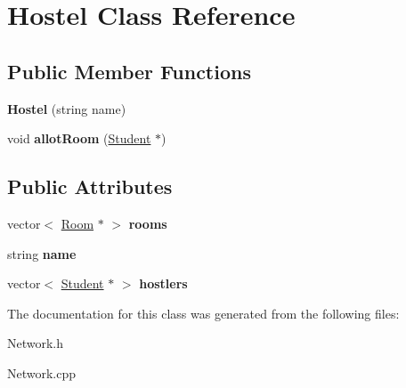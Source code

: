 \hypertarget{classHostel}{\section{\-Hostel \-Class \-Reference}
\label{classHostel}
}
\subsection*{\-Public \-Member \-Functions}
\begin{DoxyCompactItemize}
\item 
\hypertarget{classHostel_a37a55ea9e65c4f46d0e2f89dddfa7d8a}{{\bfseries \-Hostel} (string name)}\label{classHostel_a37a55ea9e65c4f46d0e2f89dddfa7d8a}

\item 
\hypertarget{classHostel_a6971e3cdff1eb5aab1ec74290c33638f}{void {\bfseries allot\-Room} (\hyperlink{classStudent}{\-Student} $\ast$)}\label{classHostel_a6971e3cdff1eb5aab1ec74290c33638f}

\end{DoxyCompactItemize}
\subsection*{\-Public \-Attributes}
\begin{DoxyCompactItemize}
\item 
\hypertarget{classHostel_aa84202dc8d0f8846241bb40db35c742d}{vector$<$ \hyperlink{classRoom}{\-Room} $\ast$ $>$ {\bfseries rooms}}\label{classHostel_aa84202dc8d0f8846241bb40db35c742d}

\item 
\hypertarget{classHostel_a1eb36ebea842563b14f143086f7abc61}{string {\bfseries name}}\label{classHostel_a1eb36ebea842563b14f143086f7abc61}

\item 
\hypertarget{classHostel_ad976229b1d1fc3c33741902db8c2e999}{vector$<$ \hyperlink{classStudent}{\-Student} $\ast$ $>$ {\bfseries hostlers}}\label{classHostel_ad976229b1d1fc3c33741902db8c2e999}

\end{DoxyCompactItemize}


\-The documentation for this class was generated from the following files\-:\begin{DoxyCompactItemize}
\item 
\-Network.\-h\item 
\-Network.\-cpp\end{DoxyCompactItemize}
